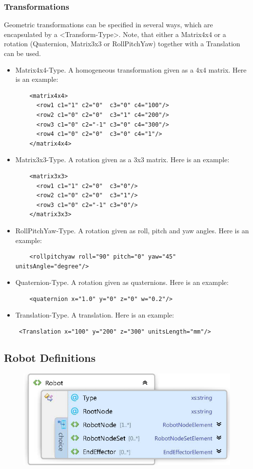 \documentclass{book}
\begin{document}
\subsubsection{Transformations}
Geometric transformations can be specified in several ways, which are encapsulated by a <Transform-Type>. Note, that either a Matrix4x4 or a rotation (Quaternion, Matrix3x3 or RollPitchYaw) together with a Translation can be used. 
\begin{itemize}
\item Matrix4x4-Type. A homogeneous transformation given as a 4x4 matrix. Here is an example:
\begin{lstlisting}
    <matrix4x4>
      <row1 c1="1" c2="0"  c3="0" c4="100"/>
      <row2 c1="0" c2="0"  c3="1" c4="200"/>
      <row3 c1="0" c2="-1" c3="0" c4="300"/>
      <row4 c1="0" c2="0"  c3="0" c4="1"/>
    </matrix4x4>
\end{lstlisting}
\item Matrix3x3-Type. A rotation given as a 3x3 matrix. Here is an example: 
\begin{lstlisting}
    <matrix3x3>
      <row1 c1="1" c2="0"  c3="0"/>
      <row2 c1="0" c2="0"  c3="1"/>
      <row3 c1="0" c2="-1" c3="0"/>
    </matrix3x3>
\end{lstlisting}
\item RollPitchYaw-Type. A rotation given as roll, pitch and yaw angles. Here is an example: 
\begin{lstlisting}
    <rollpitchyaw roll="90" pitch="0" yaw="45" unitsAngle="degree"/>
\end{lstlisting}
\item Quaternion-Type. A rotation given as quaternions. Here is an example: 
\begin{lstlisting}
    <quaternion x="1.0" y="0" z="0" w="0.2"/>
\end{lstlisting}
\item Translation-Type. A translation. Here is an example: 
\begin{lstlisting}
 <Translation x="100" y="200" z="300" unitsLength="mm"/>
\end{lstlisting}
\end{itemize}
\subsection{Robot Definitions}
\begin{figure}[H]
	\centering
	\includegraphics[width=\textwidth]{Xsd_Robot}
\end{figure}
\end{document}
